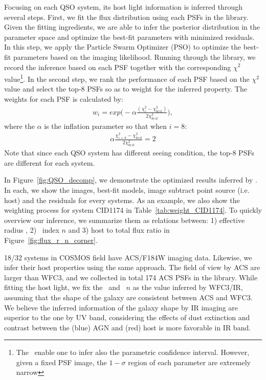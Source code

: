 \documentclass[apj]{emulateapj}
\begin{document}
Focusing on each QSO system, its host light information is inferred through several steps. First, we fit the flux distribution using each PSFs in the library. Given the fitting ingredients, we are able to infer the posterior distribution in the parameter space and optimize the best-fit parameters with minimized residuals. In this step, we apply the Particle Swarm Optimizer (PSO) to optimize the best-fit parameters based on the imaging likelihood. Running through the library, we record the inference based on each PSF together with the corresponding $\chi^2$ value\footnote{The \lenstronomy\ enable one to infer also the parametric confidence interval. However, given a fixed PSF image, the $1-\sigma$ region of each parameter are extremely narrow}. In the second step, we rank the performance of each PSF based on the $\chi^2$ value and select the top-8 PSFs so as to weight for the inferred property. The weights for each PSF is calculated by:
\begin{eqnarray}
\label{eq:weights}
w_i = exp \big(- \alpha \frac{ (\chi_i ^2 - \chi_{best} ^2 )}{2 \chi_{best} ^2} \big),
\end{eqnarray} 
where the $\alpha$ is the inflation parameter so that when $i=8$:
\begin{eqnarray}
\label{eq:alpha}
\alpha \frac{ \chi_{i=8} ^2 - \chi_{best} ^2 }{2 \chi_{best} ^2} = 2
\end{eqnarray} 
Note that since each QSO system has different seeing condition, the top-8 PSFs are different for each system.

In Figure~\ref{fig:QSO_decomp}, we demonstrate the optimized results inferred by \lenstronomy. In each, we show the images, best-fit models, image subtract point source (i.e. host) and the residuals for every systems. As an example, we also show the weighting process for system CID1174 in Table~\ref{tab:weight_CID1174}. To quickly overview our inference, we summarize them as relations between: 1) effective radius \Reff, 2) \sersic\ index $n$ and 3) host to total flux ratio in Figure~\ref{fig:flux_r_n_corner}.

18/32 systems in COSMOS field have ACS/F184W imaging data. Likewise, we infer their host properties using the same approach. The field of view by ACS are larger than WFC3, and we collected in total 174 ACS PSFs in the library. While fitting the host light, we fix the \Reff\ and \sersic\ $n$ as the value inferred by WFC3/IR, assuming that the shape of the galaxy are consistent between ACS and WFC3. We believe the inferred information of the galaxy shape by IR imaging are superior to the one by UV band, considering the effects of dust extinction and contrast between the (blue) AGN and (red) host is more favorable in IR band.
\end{document}
